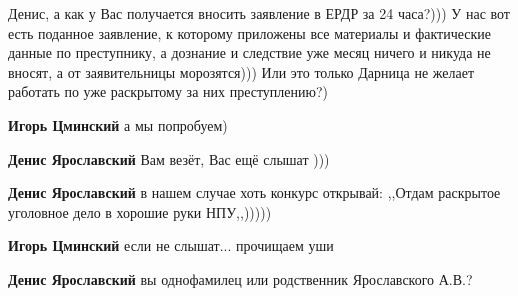 \begin{itemize}
Денис, а как у Вас получается вносить заявление в ЕРДР за 24 часа?))) У нас вот
есть поданное заявление, к которому приложены все материалы и фактические
данные по преступнику, а дознание и следствие уже месяц ничего и никуда не
вносят, а от заявительницы морозятся))) Или это только Дарница не желает
работать по уже раскрытому за них преступлению?)

\begin{itemize}
 
\textbf{Игорь Цминский} а мы попробуем)

 
\textbf{Денис Ярославский} Вам везёт, Вас ещё слышат )))

 
\textbf{Денис Ярославский} в нашем случае хоть конкурс открывай: ,,Отдам раскрытое уголовное дело в хорошие руки НПУ,,)))))


 
\textbf{Игорь Цминский} если не слышат... прочищаем уши

 
\textbf{Денис Ярославский} вы однофамилец или родственник Ярославского А.В.?
\end{itemize}

 

\end{itemize}
